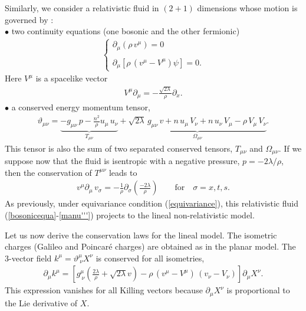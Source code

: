 \documentclass[11pt,a4paper]{article}
\begin{document}
Similarly, we consider a relativistic fluid in $(2+1)$ dimensions  whose motion is governed by :\\
$\bullet$ two continuity equations (one bosonic and the other fermionic)
\begin{eqnarray}
\left\lbrace\begin{array}{l}
\partial_\mu(\rho\,v^\mu)=0\\
\\
\partial_\mu\left[\rho\,(v^\mu-V^\mu)\psi\right]=0.
\end{array}
\right.
\label{bosonicequa}
\end{eqnarray}
Here $V^\mu$ is a spacelike vector
\begin{eqnarray}
V^\mu\partial_{\mu}=-\frac{\sqrt{2\lambda}}{\rho}\partial_x.
\label{Vmu}
\end{eqnarray}
$\bullet$ a conserved energy momentum tensor,
\begin{eqnarray}
\vartheta_{\mu\nu}=\underbrace{-g_{\mu\nu}\,p-\frac{n^2}{\rho}u_\mu\,u_\nu}_{T_{\mu\nu}}+\underbrace{\displaystyle{\sqrt{2\lambda}\,
g_{\mu\nu}\, v+n\,u_\mu\,V_\nu+n\,u_\nu\,V_\mu-\rho\,V_\mu\,V_\nu}}_{\Omega_{\mu\nu}}.
\label{tensorr}
\end{eqnarray}
This tensor is also the sum of two separated conserved tensors, $T_{\mu\nu}$ and $\Omega_{\mu\nu}$. If we suppose now that the fluid is isentropic with a negative pressure, $p=-2\lambda/\rho$, then the conservation of $T^{\mu\nu}$ leads to
\begin{eqnarray}
v^\mu\partial_\mu\,v_\sigma=-\frac{1}{\rho}\partial_\sigma\left(\frac{-2\lambda}{\rho}\right)\qquad\mbox{for}\quad \sigma=x, t, s.
\label{manu'''}
\end{eqnarray}
As previously, under equivariance condition (\ref{equivariance}), this relativistic fluid (\ref{bosonicequa}-\ref{manu'''}) projects to the lineal non-relativistic model.

Let us now derive the conservation laws for the lineal model. The isometric charges (Galileo and Poincar\'e charges) are obtained as in the planar model. The $3$-vector field $k^\mu=\vartheta^\mu_{\ \nu} X^\nu$ is conserved for all isometries,
\begin{eqnarray}
\partial_\mu k^\mu=\left[g^\mu_{\ \nu}\left(\frac{2\lambda}{\rho}+\sqrt{2\lambda}v\right)-\rho\,(v^\mu-V^\mu)\,(v_\nu-V_\nu)\right]\partial_\mu X^\nu.
\label{lynx}
\end{eqnarray} 
This expression vanishes for all Killing vectors because $\partial_\mu X^\nu$ is proportional to the Lie derivative of $X$.
\end{document}
